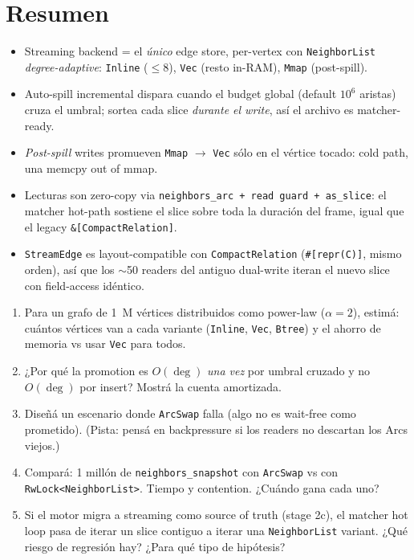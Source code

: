 \section{Resumen}

\begin{itemize}
    \item Streaming backend = el \emph{único} edge store, per-vertex
    con \texttt{NeighborList} \emph{degree-adaptive}:
    \texttt{Inline} ($\leq 8$), \texttt{Vec} (resto in-RAM),
    \texttt{Mmap} (post-spill).
    \item Auto-spill incremental dispara cuando el budget global
    (default $10^6$ aristas) cruza el umbral; sortea cada slice
    \emph{durante el write}, así el archivo es matcher-ready.
    \item \emph{Post-spill} writes promueven \texttt{Mmap} \(\to\)
    \texttt{Vec} sólo en el vértice tocado: cold path, una memcpy
    out of mmap.
    \item Lecturas son zero-copy via \texttt{neighbors\_arc + read
    guard + as\_slice}: el matcher hot-path sostiene el slice
    sobre toda la duración del frame, igual que el legacy
    \texttt{\&[CompactRelation]}.
    \item \texttt{StreamEdge} es layout-compatible con
    \texttt{CompactRelation} (\texttt{\#[repr(C)]}, mismo orden),
    así que los $\sim$50 readers del antiguo dual-write iteran el
    nuevo slice con field-access idéntico.
\end{itemize}

\begin{ejercicios}
\begin{enumerate}
    \item \starred{} Para un grafo de 1~M vértices distribuidos
    como power-law (\(\alpha = 2\)), estimá: cuántos vértices van a
    cada variante (\texttt{Inline}, \texttt{Vec}, \texttt{Btree}) y
    el ahorro de memoria vs usar \texttt{Vec} para todos.

    \item ¿Por qué la promotion es $O(\deg)$ \emph{una vez} por
    umbral cruzado y no $O(\deg)$ por insert? Mostrá la cuenta
    amortizada.

    \item \starred{} Diseñá un escenario donde \texttt{ArcSwap}
    falla (algo no es wait-free como prometido). (Pista: pensá en
    backpressure si los readers no descartan los Arcs viejos.)

    \item Compará: 1 millón de \texttt{neighbors\_snapshot} con
    \texttt{ArcSwap} vs con \texttt{RwLock<NeighborList>}. Tiempo y
    contention. ¿Cuándo gana cada uno?

    \item Si el motor migra a streaming como source of truth
    (stage 2c), el matcher hot loop pasa de iterar un slice
    contiguo a iterar una \texttt{NeighborList} variant. ¿Qué
    riesgo de regresión hay? ¿Para qué tipo de hipótesis?
\end{enumerate}
\end{ejercicios}
